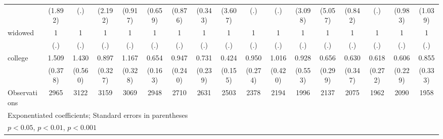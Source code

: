 {\begin{tabular}{l*{16}{c}}
                    &     (1.892)         &         (.)         &     (2.192)         &     (0.917)         &     (0.659)         &     (0.876)         &     (0.343)         &     (3.607)         &         (.)         &         (.)         &     (3.098)         &     (5.057)         &     (0.842)         &         (.)         &     (0.983)         &     (1.039)         \\
[1em]
widowed             &           1         &           1         &           1         &           1         &           1         &           1         &           1         &           1         &           1         &           1         &           1         &           1         &           1         &           1         &           1         &           1         \\
                    &         (.)         &         (.)         &         (.)         &         (.)         &         (.)         &         (.)         &         (.)         &         (.)         &         (.)         &         (.)         &         (.)         &         (.)         &         (.)         &         (.)         &         (.)         &         (.)         \\
[1em]
college             &       1.509         &       1.430         &       0.897         &       1.167         &       0.654         &       0.947         &       0.731         &       0.424\sym{*}  &       0.950         &       1.016         &       0.928         &       0.656         &       0.630         &       0.618         &       0.606         &       0.855         \\
                    &     (0.378)         &     (0.560)         &     (0.327)         &     (0.328)         &     (0.163)         &     (0.240)         &     (0.239)         &     (0.155)         &     (0.274)         &     (0.420)         &     (0.553)         &     (0.299)         &     (0.347)         &     (0.272)         &     (0.229)         &     (0.333)         \\
\hline
Observations        &        2965         &        3122         &        3159         &        3069         &        2948         &        2710         &        2631         &        2503         &        2378         &        2194         &        1996         &        2137         &        2075         &        1962         &        2090         &        1958         \\
\hline\hline
\multicolumn{17}{l}{\footnotesize Exponentiated coefficients; Standard errors in parentheses}\\
\multicolumn{17}{l}{\footnotesize \sym{*} \(p<0.05\), \sym{**} \(p<0.01\), \sym{***} \(p<0.001\)}\\
\end{tabular}
}
